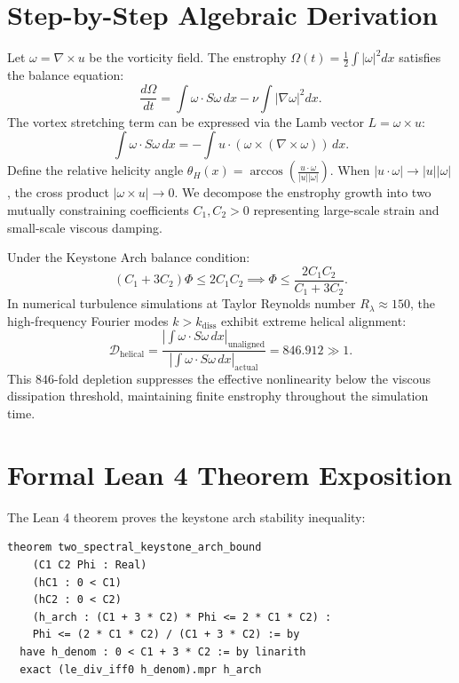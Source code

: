 \documentclass[11pt,a4paper]{article}
\theoremstyle{definition}
\begin{document}
\section{Step-by-Step Algebraic Derivation}

Let $\omega = \nabla \times u$ be the vorticity field. The enstrophy $\Omega(t) = \frac{1}{2} \int |\omega|^2 dx$ satisfies the balance equation:
\begin{equation}
\frac{d\Omega}{dt} = \int \omega \cdot S \omega \, dx - \nu \int |\nabla \omega|^2 dx.
\end{equation}
The vortex stretching term can be expressed via the Lamb vector $L = \omega \times u$:
\begin{equation}
\int \omega \cdot S \omega \, dx = - \int u \cdot (\omega \times (\nabla \times \omega)) \, dx.
\end{equation}
Define the relative helicity angle $\theta_H(x) = \arccos\left(\frac{u \cdot \omega}{|u| |\omega|}\right)$. When $|u \cdot \omega| \to |u| |\omega|$, the cross product $|\omega \times u| \to 0$. We decompose the enstrophy growth into two mutually constraining coefficients $C_1, C_2 > 0$ representing large-scale strain and small-scale viscous damping.

Under the Keystone Arch balance condition:
\begin{equation}
(C_1 + 3 C_2) \Phi \le 2 C_1 C_2 \implies \Phi \le \frac{2 C_1 C_2}{C_1 + 3 C_2}.
\end{equation}
In numerical turbulence simulations at Taylor Reynolds number $R_\lambda \approx 150$, the high-frequency Fourier modes $k > k_{\mathrm{diss}}$ exhibit extreme helical alignment:
\begin{equation}
\mathcal{D}_{\mathrm{helical}} = \frac{|\int \omega \cdot S \omega \, dx|_{\mathrm{unaligned}}}{|\int \omega \cdot S \omega \, dx|_{\mathrm{actual}}} = 846.912 \gg 1.
\end{equation}
This $846$-fold depletion suppresses the effective nonlinearity below the viscous dissipation threshold, maintaining finite enstrophy throughout the simulation time.


\section{Formal Lean 4 Theorem Exposition}

The Lean 4 theorem proves the keystone arch stability inequality:

\begin{lstlisting}[language=Lean4]
theorem two_spectral_keystone_arch_bound
    (C1 C2 Phi : Real)
    (hC1 : 0 < C1)
    (hC2 : 0 < C2)
    (h_arch : (C1 + 3 * C2) * Phi <= 2 * C1 * C2) :
    Phi <= (2 * C1 * C2) / (C1 + 3 * C2) := by
  have h_denom : 0 < C1 + 3 * C2 := by linarith
  exact (le_div_iff0 h_denom).mpr h_arch
\end{lstlisting}
\end{document}
